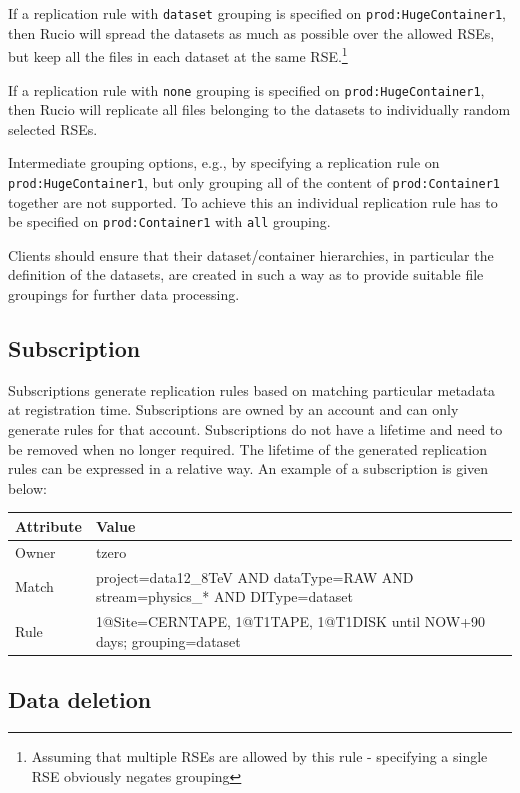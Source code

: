 \documentclass{atlasnote}
\begin{document}
If a replication rule with \texttt{dataset} grouping is specified on \texttt{prod:HugeContainer1}, then Rucio will spread the datasets as much as possible over the allowed RSEs, but keep all the files in each dataset at the same RSE.\footnote{Assuming that multiple RSEs are allowed by this rule - specifying a single RSE obviously negates grouping}

If a replication rule with \texttt{none} grouping is specified on \texttt{prod:HugeContainer1}, then Rucio will replicate all files belonging to the datasets to individually random selected RSEs.

Intermediate grouping options, e.g., by specifying a replication rule on \texttt{prod:HugeContainer1}, but only grouping all of the content of \texttt{prod:Container1} together are not supported. To achieve this an individual replication rule has to be specified on \texttt{prod:Container1} with \texttt{all} grouping.

Clients should ensure that their dataset/container hierarchies, in particular the definition of the datasets, are created in such a way as to provide suitable file groupings for further data processing.

\subsection{Subscription}
\label{sec:Subscription}

Subscriptions generate replication rules based on matching particular metadata at registration time. Subscriptions are owned by an account and can only generate rules for that account. Subscriptions do not have a lifetime and need to be removed when no longer required. The lifetime of the generated replication rules can be expressed in a relative way. An example of a subscription is given below:

\bigskip

\begin{tabular}{l p{11cm}}
\toprule
\textbf{Attribute} & \textbf{Value} \\
\midrule
Owner & tzero \\
Match & project=data12\_8TeV AND dataType=RAW AND stream=physics\_* AND DIType=dataset \\
Rule & 1@Site=CERNTAPE, 1@T1TAPE, 1@T1DISK until NOW+90 days; grouping=dataset \\
\bottomrule
\end{tabular}

\subsection{Data deletion}
\label{sec:Datadeletion}
\end{document}
